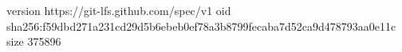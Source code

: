 version https://git-lfs.github.com/spec/v1
oid sha256:f59dbd271a231cd29d5b6ebeb0ef78a3b8799fecaba7d52ca9d478793aa0e11c
size 375896

